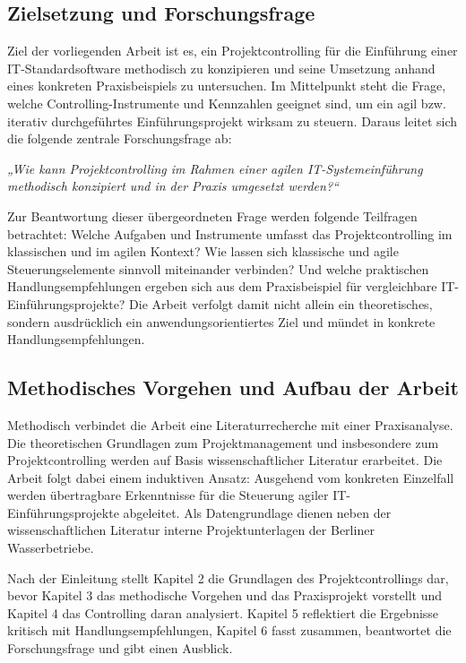 \documentclass[
    12pt, 
    a4paper,
    ]{scrartcl} %
\begin{document}
\subsection{Zielsetzung und Forschungsfrage}
Ziel der vorliegenden Arbeit ist es, ein Projektcontrolling für die Einführung einer IT-Standardsoftware methodisch zu konzipieren und seine Umsetzung anhand eines konkreten Praxisbeispiels zu untersuchen. Im Mittelpunkt steht die Frage, welche Controlling-Instrumente und Kennzahlen geeignet sind, um ein agil bzw. iterativ durchgeführtes Einführungsprojekt wirksam zu steuern. Daraus leitet sich die folgende zentrale Forschungsfrage ab:

\textit{„Wie kann Projektcontrolling im Rahmen einer agilen IT-Systemeinführung methodisch konzipiert und in der Praxis umgesetzt werden?“}

Zur Beantwortung dieser übergeordneten Frage werden folgende Teilfragen betrachtet: Welche Aufgaben und Instrumente umfasst das Projektcontrolling im klassischen und im agilen Kontext? Wie lassen sich klassische und agile Steuerungselemente sinnvoll miteinander verbinden? Und welche praktischen Handlungsempfehlungen ergeben sich aus dem Praxisbeispiel für vergleichbare IT-Einführungsprojekte? Die Arbeit verfolgt damit nicht allein ein theoretisches, sondern ausdrücklich ein anwendungsorientiertes Ziel und mündet in konkrete Handlungsempfehlungen.

\subsection{Methodisches Vorgehen und Aufbau der Arbeit}
Methodisch verbindet die Arbeit eine Literaturrecherche mit einer Praxisanalyse. Die theoretischen Grundlagen zum Projektmanagement und insbesondere zum Projektcontrolling werden auf Basis wissenschaftlicher Literatur erarbeitet. Die Arbeit folgt dabei einem induktiven Ansatz: Ausgehend vom konkreten Einzelfall werden übertragbare Erkenntnisse für die Steuerung agiler IT-Einführungsprojekte abgeleitet. Als Datengrundlage dienen neben der wissenschaftlichen Literatur interne Projektunterlagen der Berliner Wasserbetriebe.

Nach der Einleitung stellt Kapitel 2 die Grundlagen des Projektcontrollings dar, bevor Kapitel 3 das methodische Vorgehen und das Praxisprojekt vorstellt und Kapitel 4 das Controlling daran analysiert. Kapitel 5 reflektiert die Ergebnisse kritisch mit Handlungsempfehlungen, Kapitel 6 fasst zusammen, beantwortet die Forschungsfrage und gibt einen Ausblick. 
\end{document}
